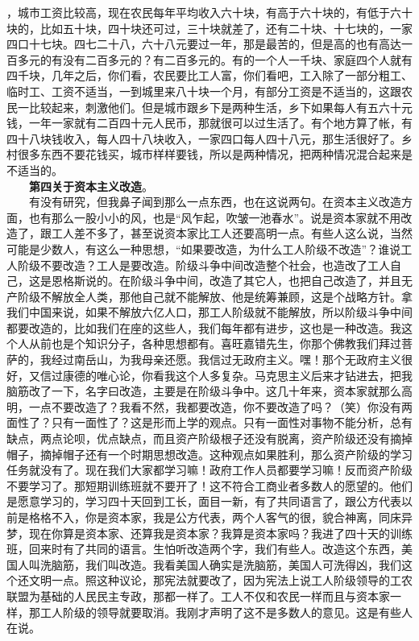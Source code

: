 \documentclass[cn,11pt,chinese]{elegantbook}
\begin{document}
，城市工资比较高，现在农民每年平均收入六十块，有高于六十块的，有低于六十块的，比如五十块，四十块还可过，三十块就差了，还有二十块、十七块的，一家四口十七块。四七二十八，六十八元要过一年，那是最苦的，但是高的也有高达一百多元的有没有二百多元的？有二百多元的。有的一个人一千块、家庭四个人就有四千块，几年之后，你们看，农民要比工人富，你们看吧，工入除了一部分粗工、临时工、工资不适当，一到城里来八十块一个月，有部分工资是不适当的，这跟农民一比较起来，刺激他们。但是城市跟乡下是两种生活，乡下如果每人有五六十元钱，一年一家就有二百四十元人民币，那就很可以过生活了。有个地方算了帐，有四十八块钱收入，每人四十八块收入，一家四口每人四十八元，那生活很好了。乡村很多东西不要花钱买，城市样样要钱，所以是两种情况，把两种情况混合起来是不适当的。\\
　　\textbf{第四关于资本主义改造}。\\
　　有没有研究，但我鼻子闻到那么一点东西，也在这说两句。在资本主义改造方面，也有那么一股小小的风，也是“风乍起，吹皱一池春水”。说是资本家就不用改造了，跟工人差不多了，甚至说资本家比工人还要高明一点。有些人这么说，当然可能是少数人，有这么一种思想，“如果要改造，为什么工人阶级不改造”？谁说工人阶级不要改造？工人是要改造。阶级斗争中间改造整个社会，也造改了工人自己，这是恩格斯说的。在阶级斗争中间，改造了其它人，也把自己改造了，并且无产阶级不解放全人类，那他自己就不能解放、他是统筹兼顾，这是个战略方针。拿我们中国来说，如果不解放六亿人口，那工人阶级就不能解放，所以阶级斗争中间都要改造的，比如我们在座的这些人，我们每年都有进步，这也是一种改造。我这个人从前也是个知识分子，各种思想都有。喜旺嘉错先生，你那个佛教我们拜过菩萨的，我经过南岳山，为我母亲还愿。我信过无政府主义。嘿！那个无政府主义很好，又信过康德的唯心论，你看我这个人多复杂。马克思主义后来才钻进去，把我脑筋改了一下，名字曰改造，主要是在阶级斗争中。这几十年来，资本家就那么高明，一点不要改造了？我看不然，我都要改造，你不要改造了吗？（笑）你没有两面性了？只有一面性了？这是形而上学的观点。只有一面性对事物不能分析，总有缺点，两点论呗，优点缺点，而且资产阶级根子还没有脱离，资产阶级还没有摘掉帽子，摘掉帽子还有一个时期思想改造。这种观点如果胜利，那么资产阶级的学习任务就没有了。现在我们大家都学习嘛！政府工作人员都要学习嘛！反而资产阶级不要学习了。那短期训练班就不要开了！这不符合工商业者多数人的愿望的。他们是愿意学习的，学习四十天回到工长，面目一新，有了共同语言了，跟公方代表以前是格格不入，你是资本家，我是公方代表，两个人客气的很，貌合神离，同床异梦，现在你算是资本家、还算我是资本家？我算是资本家吗？我进了四十天的训练班，回来时有了共同的语言。生怕听改造两个字，我们有些人。改造这个东西，美国人叫洗脑筋，我们叫改造。我看美国人确实是洗脑筋，美国人可洗得凶，我们这个还文明一点。照这种议论，那宪法就要改了，因为宪法上说工人阶级领导的工农联盟为基础的人民民主专政，那都一样了。工人不仅和农民一样而且与资本家一样，那工人阶级的领导就要取消。我刚才声明了这不是多数人的意见。这是有些人在说。\\
\end{document}
